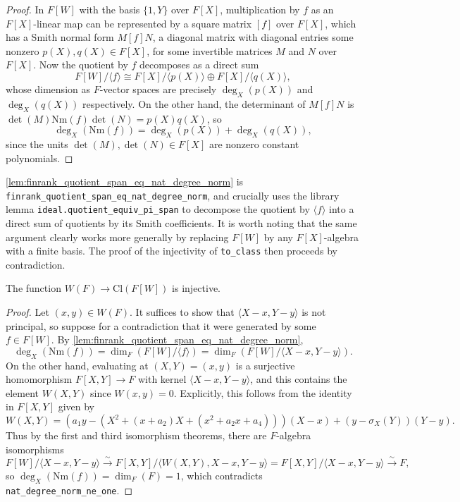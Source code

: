 \documentclass[a4paper,UKenglish,cleveref,autoref,thm-restate]{lipics-v2021}
\begin{document}
\begin{proof}
In $ F[W] $ with the basis $ \{1, Y\} $ over $ F[X] $, multiplication by $ f $ as an $ F[X] $-linear map can be represented by a square matrix $ [f] $ over $ F[X] $, which has a Smith normal form $ M[f]N $, a diagonal matrix with diagonal entries some nonzero $ p(X), q(X) \in F[X] $, for some invertible matrices $ M $ and $ N $ over $ F[X] $. Now the quotient by $ f $ decomposes as a direct sum
\[ F[W] / \langle f \rangle \cong F[X] / \langle p(X) \rangle \oplus F[X] / \langle q(X) \rangle, \]
whose dimension as $ F $-vector spaces are precisely $ \deg_X(p(X)) $ and $ \deg_X(q(X)) $ respectively. On the other hand, the determinant of $ M[f]N $ is $ \det(M)\mathrm{Nm}(f)\det(N) = p(X)q(X) $, so
\[ \deg_X(\mathrm{Nm}(f)) = \deg_X(p(X)) + \deg_X(q(X)), \]
since the units $ \det(M), \det(N) \in F[X] $ are nonzero constant polynomials.
\end{proof}

\cref{lem:finrank_quotient_span_eq_nat_degree_norm} is \texttt{finrank\_quotient\_span\_eq\_nat\_degree\_norm}, and crucially uses the library lemma \texttt{ideal.quotient\_equiv\_pi\_span} to decompose the quotient by $ \langle f \rangle $ into a direct sum of quotients by its Smith coefficients. It is worth noting that the same argument clearly works more generally by replacing $ F[W] $ by any $ F[X] $-algebra with a finite basis. The proof of the injectivity of \texttt{to\_class} then proceeds by contradiction.

\begin{lemma}
\label{lem:to_class_injective}
The function $ W(F) \to \mathrm{Cl}(F[W]) $ is injective.
\end{lemma}

\begin{proof}
Let $ (x, y) \in W(F) $. It suffices to show that $ \langle X - x, Y - y \rangle $ is not principal, so suppose for a contradiction that it were generated by some $ f \in F[W] $. By \cref{lem:finrank_quotient_span_eq_nat_degree_norm},
\[ \deg_X(\mathrm{Nm}(f)) = \dim_F(F[W] / \langle f \rangle) = \dim_F(F[W] / \langle X - x, Y - y \rangle). \]
On the other hand, evaluating at $ (X, Y) = (x, y) $ is a surjective homomorphism $ F[X, Y] \to F $ with kernel $ \langle X - x, Y - y \rangle $, and this contains the element $ W(X, Y) $ since $ W(x, y) = 0 $. Explicitly, this follows from the identity in $ F[X, Y] $ given by
\[ W(X, Y) = (a_1y - (X^2 + (x + a_2)X + (x^2 + a_2x + a_4)))(X - x) + (y - \sigma_X(Y))(Y - y). \]
Thus by the first and third isomorphism theorems, there are $ F $-algebra isomorphisms
\[ F[W] / \langle X - x, Y - y \rangle \xrightarrow{\sim} F[X, Y] / \langle W(X, Y), X - x, Y - y \rangle = F[X, Y] / \langle X - x, Y - y \rangle \xrightarrow{\sim} F, \]
so $ \deg_X(\mathrm{Nm}(f)) = \dim_F(F) = 1 $, which contradicts \texttt{nat\_degree\_norm\_ne\_one}.
\end{proof}
\end{document}
